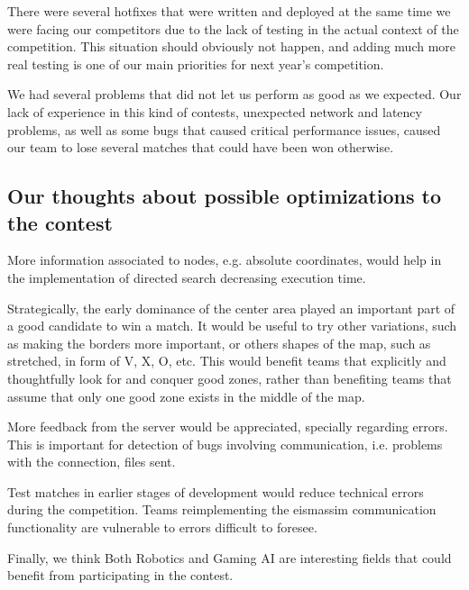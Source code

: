 \documentclass{llncs2e/llncs}
\begin{document}
    There were several hotfixes that were written and deployed at the same time we
    were facing our competitors due to the lack of testing in the actual context of
    the competition. This situation should obviously not happen, and adding much
    more real testing is one of our main priorities for next year's competition.

    We had several problems that did not let us perform as good as we expected.  Our
    lack of experience in this kind of contests, unexpected network and latency
    problems, as well as some bugs that caused critical performance issues, caused
    our team to lose several matches that could have been won otherwise.

\subsection{Our thoughts about possible optimizations to the contest}
    
    More information associated to nodes, e.g. absolute coordinates, would help
    in the implementation of directed search decreasing execution time.

    Strategically, the early dominance of the center area played an important part 
    of a good candidate to win a match. It would be useful to try other 
    variations, such as making the borders more important, or others shapes of the 
    map, such as stretched, in form of V, X, O, etc. This would benefit teams that 
    explicitly and thoughtfully look for and conquer good zones, rather than 
    benefiting teams that assume that only one good zone exists in the middle of the map.

    More feedback from the server would be appreciated, specially
    regarding errors. This is important for detection of bugs
    involving communication, i.e. problems with the connection, files sent.

    Test matches in earlier stages of development would reduce technical
    errors during the competition.  Teams reimplementing the eismassim
    communication functionality are vulnerable to errors difficult to foresee. 
    
    Finally, we think Both Robotics and Gaming AI are interesting fields that could 
    benefit from participating in the contest.

    
 
 


\end{document}
